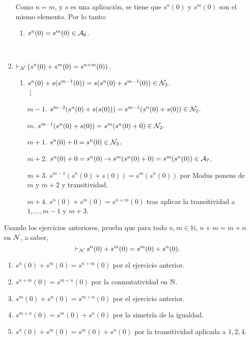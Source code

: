 \begin{ejercicio}
\begin{enumerate}
        Como $n=m$, y $s$ es una aplicación, se tiene que $s^n(0)$ y $s^m(0)$ son el mismo elemento. Por lo tanto:
        \begin{enumerate}[label=\arabic*.]
            \item $s^n(0) = s^m(0)\in \mathcal{A}_6$.
        \end{enumerate}~
        \item $\vdash_{\mathcal{N}} (s^n(0) + s^m(0) = s^{n+m}(0))$.
        \begin{enumerate}[label=\arabic*.]
            \item $s^{n}(0)+ s(s^{m-1}(0)) = s(s^{n}(0)+s^{m-1}(0))\in \mathcal{N}_2$.\\
            \vdots
            \item[$m-1$.] $s^{m-2}(s^{n}(0)+s(s(0))) = s^{m-1}(s^{n}(0)+s(0))\in \mathcal{N}_2$.
            \item[$m$.] $s^{m-1}(s^{n}(0)+s(0))=s^{m}(s^{n}(0)+0)\in \mathcal{N}_2$.
            \item[$m+1$.] $s^{n}(0)+0=s^n(0)\in \mathcal{N}_3$.
            \item[$m+2$.] $s^{n}(0)+0=s^n(0) \to s^{m}(s^{n}(0)+0)=s^m(s^n(0))\in \mathcal{A}_7$.
            \item[$m+3$.] $s^{m-1}(s^{n}(0)+s(0))=s^{m}(s^{n}(0))$ por Modus ponens de $m$ y $m+2$ y transitividad.
            \item[$m+4$.] $s^n(0) + s^m(0) = s^{n+m}(0)$ tras aplicar la transitividad a $1,\dots,m-1$ y $m+3$.
        \end{enumerate}
    \end{enumerate}
\end{ejercicio}

\begin{ejercicio}
    Usando los ejercicios anteriores, prueba que para todo $n, m \in \mathbb{N}$, $n + m = m + n$ en $\mathcal{N}$, a saber,
    \[
        \vdash_{\mathcal{N}} s^n(0) + s^m(0) = s^m(0) + s^n(0).
    \]
    \begin{enumerate}
        \item $s^n(0) + s^m(0)=s^{n+m}(0)$ por el ejercicio anterior.
        \item $s^{n+m}(0)=s^{m+n}(0)$ por la conmutatividad en $\mathbb{N}$.
        \item $s^m(0) + s^n(0)=s^{m+n}(0)$ por el ejercicio anterior.
        \item $s^{m+n}(0)=s^m(0) + s^n(0)$ por la simetría de la igualdad.
        \item $s^n(0) + s^m(0)=s^m(0) + s^n(0)$ por la transitividad aplicada a $1,2,4$.
    \end{enumerate}
\end{ejercicio}